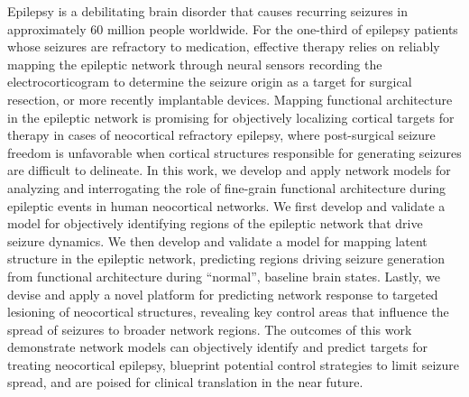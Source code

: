 
\begin{abstracts}
Epilepsy is a debilitating brain disorder that causes recurring seizures in approximately 60 million people worldwide. For the one-third of epilepsy patients whose seizures are refractory to medication, effective therapy relies on reliably mapping the epileptic network through neural sensors recording the electrocorticogram to determine the seizure origin as a target for surgical resection, or more recently implantable devices. Mapping functional architecture in the epileptic network is promising for objectively localizing cortical targets for therapy in cases of neocortical refractory epilepsy, where post-surgical seizure freedom is unfavorable when cortical structures responsible for generating seizures are difficult to delineate. In this work, we develop and apply network models for analyzing and interrogating the role of fine-grain functional architecture during epileptic events in human neocortical networks. We first develop and validate a model for objectively identifying regions of the epileptic network that drive seizure dynamics. We then develop and validate a model for mapping latent structure in the epileptic network, predicting regions driving seizure generation from functional architecture during ``normal'', baseline brain states. Lastly, we devise and apply a novel platform for predicting network response to targeted lesioning of neocortical structures, revealing key control areas that influence the spread of seizures to broader network regions. The outcomes of this work demonstrate network models can objectively identify and predict targets for treating neocortical epilepsy, blueprint potential control strategies to limit seizure spread, and are poised for clinical translation in the near future.
\end{abstracts}

